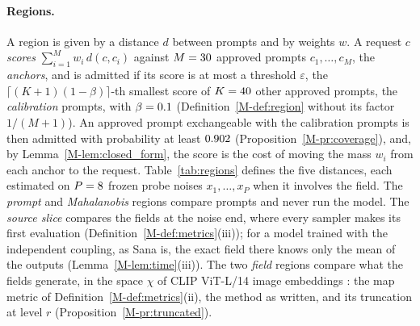 \documentclass{article}
\newcommand{\mref}[1]{\ref{M-#1}}        %
\begin{document}
\paragraph{Regions.}
A region is given by a distance $d$ between prompts and by weights $w$. A request $c$ \emph{scores}
$\sum_{i=1}^Mw_i\,d(c,c_i)$ against $M=30$ approved prompts $c_1,\dots,c_M$, the \emph{anchors}, and is admitted if its score
is at most a threshold $\varepsilon$, the $\lceil(K+1)(1-\beta)\rceil$-th smallest score of $K=40$ other approved prompts, the
\emph{calibration} prompts, with $\beta=0.1$ (Definition~\mref{def:region} without its factor $1/(M+1)$). An approved prompt
exchangeable with the calibration prompts is then admitted with probability at least $0.902$ (Proposition~\mref{pr:coverage}), and,
by Lemma~\mref{lem:closed_form}, the score is the cost of moving the mass $w_i$ from each anchor to the request. Table~\ref{tab:regions}
defines the five distances, each estimated on $P=8$ frozen probe noises $x_1,\dots,x_P$ when it involves the field. The
\emph{prompt} and \emph{Mahalanobis} regions compare prompts and never run the model. The \emph{source slice} compares the fields
at the noise end, where every sampler makes its first evaluation (Definition~\mref{def:metrics}(iii)); for a model trained with the
independent coupling, as Sana is, the exact field there knows only the mean of the outputs (Lemma~\mref{lem:time}(iii)). The two
\emph{field} regions compare what the fields generate, in the space $\chi$ of CLIP ViT-L/14 image embeddings
\citep{radford2021learning}: the map metric of Definition~\mref{def:metrics}(ii), the method as written, and its truncation at level
$r$ (Proposition~\mref{pr:truncated}).
\end{document}
